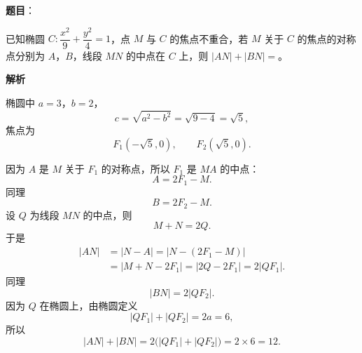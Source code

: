\begin{answer}

\textbf{题目}：

已知椭圆 $C:\dfrac{x^2}9+\dfrac{y^2}4=1$，点 $M$ 与 $C$ 的焦点不重合，若 $M$ 关于 $C$ 的焦点的对称点分别为 $A$，$B$，线段 $MN$ 的中点在 $C$ 上，则 $|AN|+|BN|=$\gkblank{}。

\textbf{解析}

椭圆中 $a=3$，$b=2$，
\nopagebreak[4]
\[c=\sqrt{a^2-b^2}=\sqrt{9-4}=\sqrt5,\]
焦点为
\nopagebreak[4]
\[F_1(-\sqrt5,0),\qquad F_2(\sqrt5,0).\]

因为 $A$ 是 $M$ 关于 $F_1$ 的对称点，所以 $F_1$ 是 $MA$ 的中点：
\nopagebreak[4]
\[A=2F_1-M.\]
同理
\nopagebreak[4]
\[B=2F_2-M.\]
设 $Q$ 为线段 $MN$ 的中点，则
\nopagebreak[4]
\[M+N=2Q.\]
于是
\nopagebreak[4]
\[\begin{aligned}
|AN|
&=|N-A|
=|N-(2F_1-M)|\\
&=|M+N-2F_1|
=|2Q-2F_1|
=2|QF_1|.
\end{aligned}\]
同理
\nopagebreak[4]
\[|BN|=2|QF_2|.\]
因为 $Q$ 在椭圆上，由椭圆定义
\nopagebreak[4]
\[|QF_1|+|QF_2|=2a=6,\]
所以
\nopagebreak[4]
\[|AN|+|BN|
=2\bigl(|QF_1|+|QF_2|\bigr)
=2\times6=12.\]


\end{answer}
